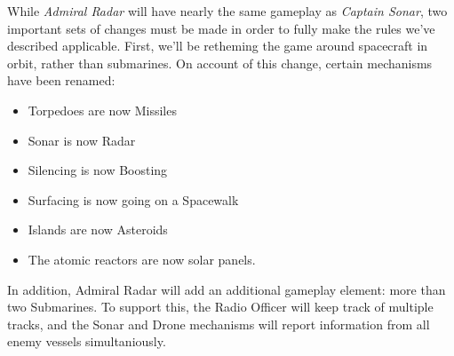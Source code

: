 While \textit{Admiral Radar} will have nearly the same gameplay as \textit{Captain Sonar}, two important sets of changes must be made in order to fully make the rules we've described applicable. First, we'll be retheming the game around spacecraft in orbit, rather than submarines. On account of this change, certain mechanisms have been renamed:

\begin{itemize}
\item Torpedoes are now Missiles
\item Sonar is now Radar
\item Silencing is now Boosting
\item Surfacing is now going on a Spacewalk
\item Islands are now Asteroids
\item The atomic reactors are now solar panels.
\end{itemize}

In addition, Admiral Radar will add an additional gameplay element: more than two Submarines. To support this, the Radio Officer will keep track of multiple tracks, and the Sonar and Drone mechanisms will report information from all enemy vessels simultaniously. 
